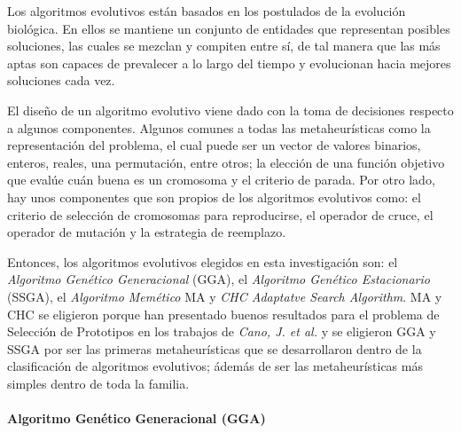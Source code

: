 Los algoritmos evolutivos \cite{talbi2009metaheuristics} están basados en los postulados de la evolución biológica. En ellos se mantiene un conjunto de entidades que representan posibles soluciones, las cuales se mezclan y compiten entre sí, de tal manera que las más aptas son capaces de prevalecer a lo largo del tiempo y evolucionan hacia mejores soluciones cada vez.

El diseño de un algoritmo evolutivo viene dado con la toma de decisiones respecto a algunos componentes. Algunos comunes a todas las metaheurísticas como la representación del problema, el cual puede ser un vector de valores binarios, enteros, reales, una permutación, entre otros; la elección de una función objetivo que evalúe cuán buena es un cromosoma y el criterio de parada. Por otro lado, hay unos componentes que son propios de los algoritmos evolutivos como: el criterio de selección de cromosomas para reproducirse, el operador de cruce, el operador de mutación y la estrategia de reemplazo.


Entonces, los algoritmos evolutivos elegidos en esta investigación son: el \emph{Algoritmo Genético Generacional} (GGA), el \emph{Algoritmo Genético Estacionario} (SSGA), el \emph{Algoritmo Memético} MA y \emph{CHC Adaptatve Search Algorithm}. MA y CHC se eligieron porque han presentado buenos resultados para el problema de Selección de Prototipos en los trabajos de \emph{Cano, J. et al.} \cite{garcia2012prototype, garcia2008memetic} y se eligieron GGA y SSGA por ser las primeras metaheurísticas que se desarrollaron dentro de la clasificación de algoritmos evolutivos; ádemás de ser las metaheurísticas más simples dentro de toda la familia.

\paragraph{Algoritmo Genético Generacional (GGA)}

